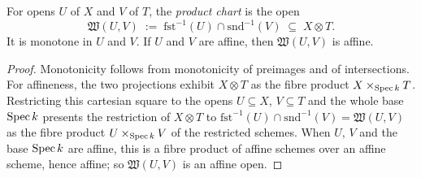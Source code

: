 \begin{definition}
  \label{pa-def:productChart}
  \leanok

  For opens \(U\) of \(X\) and \(V\) of \(T\), the \emph{product chart} is the open
  \[
    \mathfrak W(U,V) \;:=\; \mathrm{fst}^{-1}(U) \cap \mathrm{snd}^{-1}(V) \;\subseteq\; X \otimes T .
  \]
  It is monotone in \(U\) and \(V\). If \(U\) and \(V\) are affine, then \(\mathfrak W(U,V)\) is
  affine.
\end{definition}
\begin{proof}
  \leanok
  Monotonicity follows from monotonicity of preimages and of intersections. For affineness, the
  two projections exhibit \(X \otimes T\) as the fibre product \(X \times_{\operatorname{Spec} k} T\).
  Restricting this cartesian square to the opens \(U \subseteq X\), \(V \subseteq T\) and the
  whole base \(\operatorname{Spec} k\) presents the restriction of \(X \otimes T\) to
  \(\mathrm{fst}^{-1}(U) \cap \mathrm{snd}^{-1}(V) = \mathfrak W(U,V)\) as the fibre product
  \(U \times_{\operatorname{Spec} k} V\) of the restricted schemes. When \(U\), \(V\) and the base \(\operatorname{Spec} k\)
  are affine, this is a fibre product of affine schemes over an affine scheme, hence affine; so
  \(\mathfrak W(U,V)\) is an affine open.
\end{proof}

